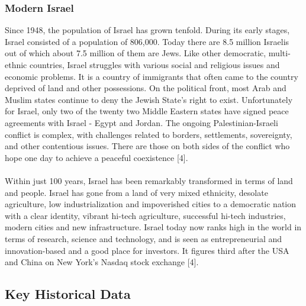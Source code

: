 \documentclass[10pt]{article}
\begin{document}
\subsubsection{Modern Israel}
Since 1948, the population of Israel has grown tenfold. During its early stages, Israel consisted of a population of 806,000. Today there are 8.5 million Israelis out of which about 7.5 million of them are Jews. Like other democratic, multi-ethnic countries, Israel struggles with various social and religious issues and economic problems. It is a country of immigrants that often came to the country deprived of land and other possessions. On the political front, most Arab and Muslim states continue to deny the Jewish State’s right to exist. Unfortunately for Israel, only two of the twenty two Middle Eastern states have signed peace agreements with Israel - Egypt and Jordan. The ongoing Palestinian-Israeli conflict is complex, with challenges related to borders, settlements, sovereignty, and other contentious issues. There are those on both sides of the conflict who hope one day to achieve a peaceful coexistence [4].
\\
\\
Within just 100 years, Israel has been remarkably transformed in terms of land and people. Israel has gone from a land of very mixed ethnicity, desolate agriculture, low industrialization and impoverished cities to a democratic nation with a clear identity, vibrant hi-tech agriculture, successful hi-tech industries, modern cities and new infrastructure. Israel today now ranks high in the world in terms of research, science and technology, and is seen as entrepreneurial and innovation-based and a good place for investors. It figures third after the USA and China on New York’s Nasdaq stock exchange [4].

\subsection{Key Historical Data}
\end{document}
